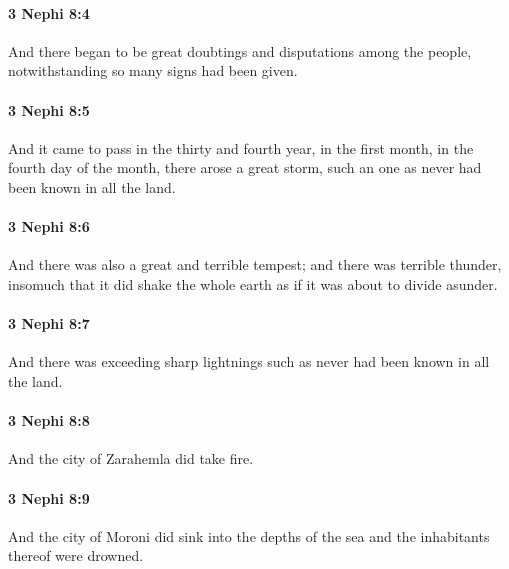 		\paragraph{3 Nephi 8:4} %
			\label{3NEPHI-8-4}

			And there began to be great doubtings and disputations among the people,
			notwithstanding so many signs had been given.

		\paragraph{3 Nephi 8:5} %
			\label{3NEPHI-8-5}

			And it came to pass in the thirty and fourth year,
			in the first month, in the fourth day of the month,
			there arose a great storm,
			such an one as never had been known in all the land.

		\paragraph{3 Nephi 8:6} %
			\label{3NEPHI-8-6}

			And there was also a great and terrible tempest;
			and there was terrible thunder,
			insomuch that it did shake the whole earth
			as if it was about to divide asunder.

		\paragraph{3 Nephi 8:7} %
			\label{3NEPHI-8-7}

			And there was exceeding sharp lightnings
			such as never had been known in all the land.

		\paragraph{3 Nephi 8:8} %
			\label{3NEPHI-8-8}

			And the city of Zarahemla did take fire.

		\paragraph{3 Nephi 8:9} %
			\label{3NEPHI-8-9}

			And the city of Moroni did sink into the depths of the sea
			and the inhabitants thereof were drowned.

